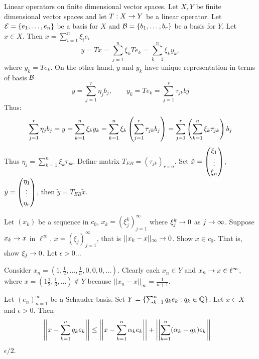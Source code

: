 \documentclass[]{article}
\begin{document}
Linear operators on finite dimensional vector spaces. 
Let $X,Y$ be finite dimensional vector spaces and let $T:X\rightarrow Y$ be a linear operator.
Let $\mathcal{E}=\left\{ e_1,\dots,e_n \right\}$ be a basis for $X$ and $\mathcal{B} = \left\{ b_1,\dots,b_r \right\}$ be a basis for $Y$.
Let $x\in X$. Then $x = \sum_{i=1}^n \xi_ie_i$
$$ y = Tx = \sum_{j=1}^n \xi_k Te_k = \sum_{k=1}^n \xi_ky_k, $$
where $y_k= Te_k$.
On the other hand, $y$ and $y_k$ have unique representation in terms of basis $\mathcal{B}$
$$ y = \sum_{j=1}^r \eta_jb_j, \qquad y_k = Te_k = \sum_{j=1}^r \tau_{jk}bj $$
Thus:
\begin{align*}
	\sum_{j=1}^r \eta_jb_j = y = \sum_{k=1}^n \xi_ky_k 
						= \sum_{k=1}^n \xi_k\left(\sum_{j=1}^r \tau_{jk}b_j\right) 
						= \sum_{j=1}^r \left(\sum_{k=1}^n \xi_k\tau_{jk}\right)b_j
\end{align*}
Thus $\eta_j = \sum_{k=1}^n \xi_k\tau_{jk}$.
Define matrix $T_{EB} = (\tau_{jk})_{r\times n}$.
Set $\tilde x = \begin{pmatrix}\xi_1\\\vdots\\\xi_n\end{pmatrix}$, $\tilde y = \begin{pmatrix}\eta_1\\\vdots\\\eta_r\end{pmatrix}$, then $\tilde y = T_{EB}\tilde x$.

\begin{example}
	[2.3-2] Let $(x_k)$ be a sequence in $c_0$, $x_k=(\xi_j^k)_{j=1}^\infty$ where $\xi_j^k\rightarrow0$ as $j\rightarrow\infty$.
	Suppose $x_k\rightarrow x$ in $\ell^\infty$, $x=(\xi_j)_{j=1}^\infty$, that is $||x_k-x||_\infty\rightarrow0$.
	Show $x\in c_0$. That is, show $\xi_j\rightarrow 0$.
	Let $\epsilon >0$...
\end{example}
\begin{example}
	[2.3-3]
	Consider $x_n = (1,\frac12,\dots,\frac1n,0,0,0,\dots)$.
	Clearly each $x_n\in Y$ and $x_n\rightarrow x\in\ell^\infty$, where $x = (1\frac12,\frac13,\dots)\notin Y$ because $||x_n-x||_\infty = \frac1{n+1}$.
\end{example}
\begin{example}
	[2.3-10] Let $(e_n)_{n=1}^\infty$ be a Schauder basis.
	Set $Y = \left\{ \sum_{k=1}^n q_ke_k : q_k\in\mathbb{Q} \right\}$. Let $x\in X$ and $\epsilon>0$.
	Then 
	\begin{align*}
		\left|\left|x-\sum_{k=1}^nq_ke_k\right|\right| &\leq \left|\left|x-\sum_{k=1}^n \alpha_ke_k\right|\right| + \left|\left|\sum_{k=1}^n(\alpha_k-q_k)e_k\right|\right|
	\end{align*}
	$\epsilon/2$.
\end{example}
\end{document}
